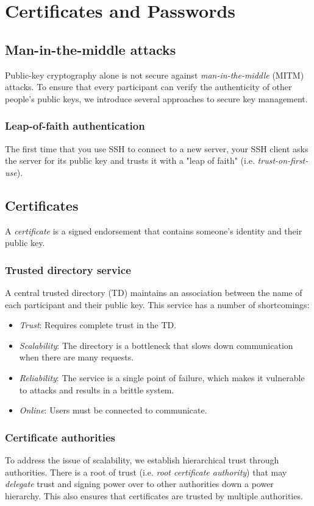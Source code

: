 \chapter{Certificates and Passwords}

\section{Man-in-the-middle attacks}
Public-key cryptography alone is not secure against \emph{man-in-the-middle} (MITM) attacks. To ensure that every participant can verify the authenticity of other people's public keys, we introduce several approaches to secure key management.

\subsection{Leap-of-faith authentication}
The first time that you use SSH to connect to a new server, your SSH client asks the server for its public key and trusts it with a "leap of faith" (i.e. \emph{trust-on-first-use}).

\section{Certificates}
A \emph{certificate} is a signed endorsement that contains someone's identity and their public key.

\subsection{Trusted directory service}
A central trusted directory (TD) maintains an association between the name of each participant and their public key. This service has a number of shortcomings:
\begin{itemize}
    \item \emph{Trust}: Requires complete trust in the TD.
    \item \emph{Scalability}: The directory is a bottleneck that slows down communication when there are many requests.
    \item \emph{Reliability}: The service is a single point of failure, which makes it vulnerable to attacks and results in a brittle system.
    \item \emph{Online}: Users must be connected to communicate.
\end{itemize}

\subsection{Certificate authorities}
To address the issue of scalability, we establish hierarchical trust through authorities. There is a root of trust (i.e. \emph{root certificate authority}) that may \emph{delegate} trust and signing power over to other authorities down a power hierarchy. This also ensures that certificates are trusted by multiple authorities.

